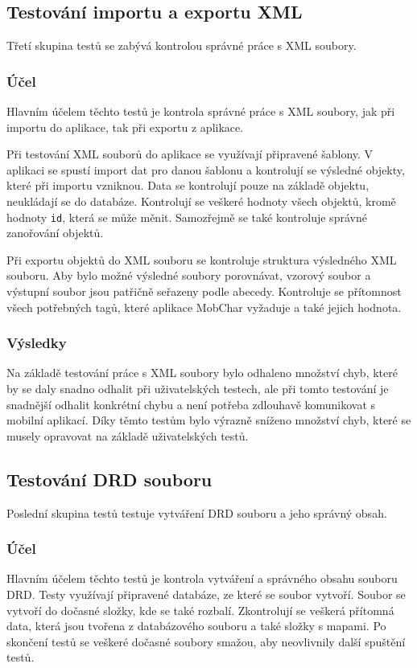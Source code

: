 \documentclass[thesis=B,czech]{resources/FITthesis}[2012/06/26]
\begin{document}
		\subsection{Testování importu a exportu XML}
Třetí skupina testů se zabývá kontrolou správné práce s XML soubory.

			\subsubsection*{Účel}
Hlavním účelem těchto testů je kontrola správné práce s XML soubory, jak při importu do aplikace, tak při exportu z aplikace. \par

Při testování XML souborů do aplikace se využívají připravené šablony. V aplikaci se spustí import dat pro danou šablonu a kontrolují se výsledné objekty, které při importu vzniknou. Data se kontrolují pouze na základě objektu, neukládají se do databáze. Kontrolují se veškeré hodnoty všech objektů, kromě hodnoty \texttt{id}, která se může měnit. Samozřejmě se také kontroluje správné zanořování objektů. \par

Při exportu objektů do XML souboru se kontroluje struktura výsledného XML souboru. Aby bylo možné výsledné soubory porovnávat, vzorový soubor a výstupní soubor jsou patřičně seřazeny podle abecedy. Kontroluje se přítomnost všech potřebných tagů, které aplikace MobChar vyžaduje a také jejich hodnota.

			\subsubsection*{Výsledky}
Na základě testování práce s XML soubory bylo odhaleno množství chyb, které by se daly snadno odhalit při uživatelských testech, ale při tomto testování je snadnější odhalit konkrétní chybu a není potřeba zdlouhavě komunikovat s mobilní aplikací. Díky těmto testům bylo výrazně sníženo množství chyb, které se musely opravovat na základě uživatelských testů. 

	\subsection{Testování DRD souboru}
Poslední skupina testů testuje vytváření DRD souboru a jeho správný obsah.

			\subsubsection*{Účel}
Hlavním účelem těchto testů je kontrola vytváření a správného obsahu souboru DRD. Testy využívají připravené databáze, ze které se soubor vytvoří. Soubor se vytvoří do dočasné složky, kde se také rozbalí. Zkontrolují se veškerá přítomná data, která jsou tvořena z databázového souboru a také složky s mapami. Po skončení testů se veškeré dočasné soubory smažou, aby neovlivnily další spuštění testů.
\end{document}
